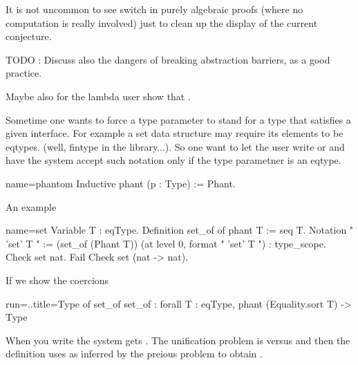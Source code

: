 It is not uncommon to see \C{/=} switch in purely algebraic proofs
(where no computation is really involved) just to clean up the display
of the current conjecture.


TODO : Discuss also the dangers of breaking abstraction barriers, as a
good practice.

Maybe also for the lambda user show that .

Sometime one wants to force a type parameter to stand for a type that
satisfies a given interface.  For example a set data structure may
require its elements to be eqtypes.  (well, fintype in the
library...).  So one want to let the user write  or
 and have the system accept such notation only
if the type parametner is an eqtype.

\begin{coq}{name=phantom}{}
Inductive phant (p : Type) := Phant.
\end{coq}

An example

\begin{coq}{name=set}{}
Variable T : eqType.
Definition set_of of phant T := seq T.
Notation "{ 'set' T }" := (set_of (Phant T))
  (at level 0, format "{ 'set'  T }") : type_scope.
Check {set nat}.
Fail Check {set (nat -> nat)}.
\end{coq}

If we show the coercions

\begin{coqout}{run=..}{title=Type of set\_of}
	set_of : forall T : eqType, phant (Equality.sort T) -> Type
\end{coqout}

When you write  the system gets
.
The unification problem is  versus 
and then the definition uses  as inferred by the preious
problem to obtain .

